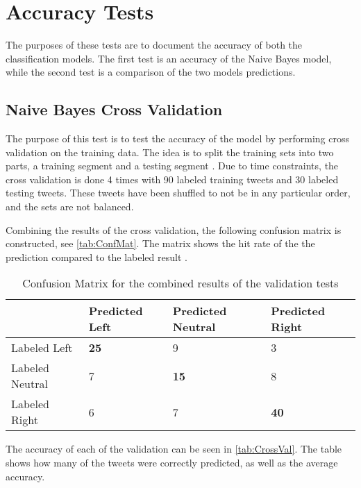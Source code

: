 \section{Accuracy Tests}\label{sec:accTest}
The purposes of these tests are to document the accuracy of both the
classification models. The first test is an accuracy of the Naive Bayes model,
while the second test is a comparison of the two models predictions.


\subsection{Naive Bayes Cross Validation}\label{subsec:NBCV}
The purpose of this test is to test the accuracy of the model by performing
cross validation on the training data. The idea is to split the training sets into two
parts, a training segment and a testing segment \citep[Ch. 7.5.2]{MIBook}. Due
to time constraints, the cross validation is done 4 times with 90 labeled
training tweets and 30 labeled testing tweets. These tweets have been shuffled
to not be in any particular order, and the sets are not balanced.\nl

Combining the results of the cross validation, the following confusion
matrix is constructed, see \autoref{tab:ConfMat}. The matrix shows the
hit rate of the the prediction compared to the labeled result
\citep{ConfusionMatrix}.

\begin{table}[H]
\centering
\begin{tabular}{l|l|l|l|}
\cline{2-4}
& Predicted Left & Predicted Neutral & Predicted Right \\ \hline 
\multicolumn{1}{|l|}{Labeled Left} & \textbf{25} & 9 & 3 \\ \hline
\multicolumn{1}{|l|}{Labeled Neutral} & 7 & \textbf{15} & 8  \\ \hline
\multicolumn{1}{|l|}{Labeled Right} & 6 & 7 & \textbf{40} \\ \hline
\end{tabular}
\caption{Confusion Matrix for the combined results of the validation tests}
\label{tab:ConfMat}
\end{table}

The accuracy of each of the validation can be seen in \autoref{tab:CrossVal}.
The table shows how many of the tweets were correctly predicted, as well as
the average accuracy. 

\begin{table}[H]
\centering
{}
\caption{Accuracy for each of the cross validations}
\label{tab:CrossVal}
\end{table}

